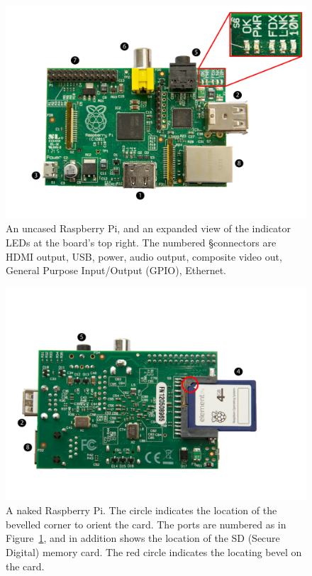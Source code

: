 \begin{figure}
\centerline{\includegraphics[width=15cm]{images/bare-rpi-annotated}}
\caption{An uncased Raspberry Pi, and an expanded view of the indicator LEDs at the board's top right. The numbered §connectors are \protect{} HDMI output,  \protect{} USB,  \protect{} power,  \protect{} audio output,  \protect{} composite video out,  \protect{} General Purpose Input/Output (GPIO),  \protect{} Ethernet.}\label{figure:bare-rpi}
\end{figure}

\begin{figure}
\centerline{\includegraphics[width=15cm]{images/bare-rpi-underside-annotated}}
\caption{A naked Raspberry Pi. The circle indicates the location of the bevelled corner to orient the card. The ports are numbered as in Figure~\ref{figure:bare-rpi}, and in addition \protect{} shows the location of the SD (Secure Digital) memory card. The red circle indicates the locating bevel on the card.}\label{figure:bare-rpi-underside}
\end{figure}

